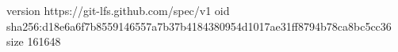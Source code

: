 version https://git-lfs.github.com/spec/v1
oid sha256:d18e6a6f7b8559146557a7b37b4184380954d1017ae31ff8794b78ca8bc5cc36
size 161648

